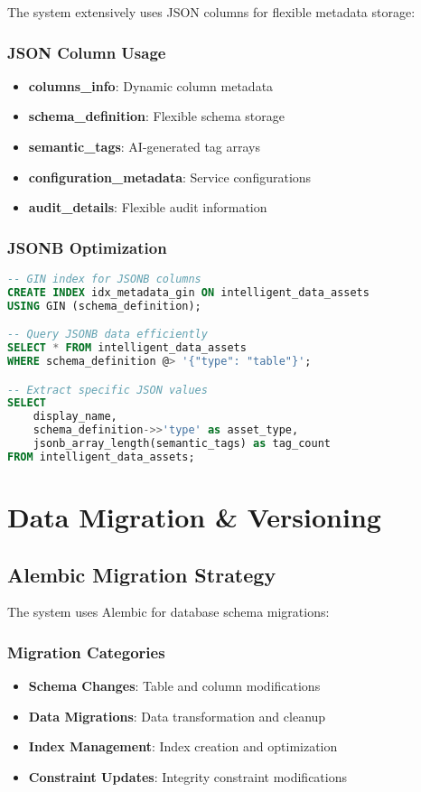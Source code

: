 The system extensively uses JSON columns for flexible metadata storage:

\subsubsection{JSON Column Usage}
\begin{itemize}
    \item \textbf{columns\_info}: Dynamic column metadata
    \item \textbf{schema\_definition}: Flexible schema storage
    \item \textbf{semantic\_tags}: AI-generated tag arrays
    \item \textbf{configuration\_metadata}: Service configurations
    \item \textbf{audit\_details}: Flexible audit information
\end{itemize}

\subsubsection{JSONB Optimization}
\begin{lstlisting}[language=SQL, caption=JSONB Query Optimization]
-- GIN index for JSONB columns
CREATE INDEX idx_metadata_gin ON intelligent_data_assets 
USING GIN (schema_definition);

-- Query JSONB data efficiently
SELECT * FROM intelligent_data_assets 
WHERE schema_definition @> '{"type": "table"}';

-- Extract specific JSON values
SELECT 
    display_name,
    schema_definition->>'type' as asset_type,
    jsonb_array_length(semantic_tags) as tag_count
FROM intelligent_data_assets;
\end{lstlisting}

\section{Data Migration \& Versioning}

\subsection{Alembic Migration Strategy}

The system uses Alembic for database schema migrations:

\subsubsection{Migration Categories}
\begin{itemize}
    \item \textbf{Schema Changes}: Table and column modifications
    \item \textbf{Data Migrations}: Data transformation and cleanup
    \item \textbf{Index Management}: Index creation and optimization
    \item \textbf{Constraint Updates}: Integrity constraint modifications
\end{itemize}

